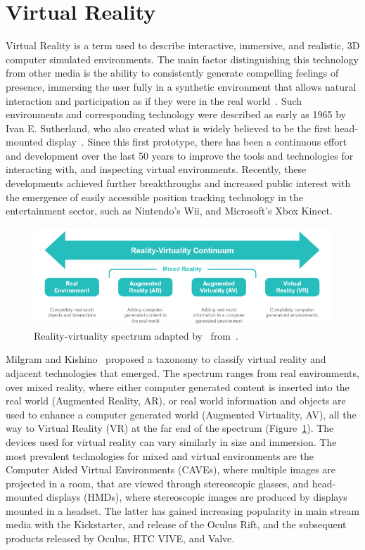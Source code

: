 \section{Virtual Reality}\label{sec:virtual-reality}

Virtual Reality is a term used to describe interactive, immersive, and realistic, 3D computer simulated environments.
The main factor distinguishing this technology from other media is the ability to consistently generate compelling
feelings of presence, immersing the user fully in a synthetic environment that allows natural interaction and
participation as if they were in the real world~\cite{Davis2014}.
Such environments and corresponding technology were described as early as 1965 by Ivan E. Sutherland, who also created
what is widely believed to be the first head-mounted display~\cite{Sutherland1968}.
Since this first prototype, there has been a continuous effort and development over the last 50 years to improve the
tools and technologies for interacting with, and inspecting virtual environments.
Recently, these developments achieved further breakthroughs and increased public interest with the emergence of
easily accessible position tracking technology in the entertainment sector, such as Nintendo's Wii, and Microsoft's
Xbox Kinect.

\begin{figure}[h]
    \centering
    \includegraphics[width=\textwidth]{content/2_1_virtual_reality/img/reality-virtuality-continuum[Spivak2015]}
    \caption{Reality-virtuality spectrum adapted by~\cite{Spivak2015} from~\cite{Milgram1994}.}
    \label{fig:environment-spectrum}
\end{figure}

Milgram and Kishino~\cite{Milgram1994} proposed a taxonomy to classify virtual reality and adjacent technologies that
emerged.
The spectrum ranges from real environments, over mixed reality, where either computer generated content is inserted
into the real world (Augmented Reality, AR), or real world information and objects are used to enhance a computer
generated world (Augmented Virtuality, AV), all the way to Virtual Reality (VR) at the far end of the spectrum
(Figure~\ref{fig:environment-spectrum}).
The devices used for virtual reality can vary similarly in size and immersion.
The most prevalent technologies for mixed and virtual environments are the Computer Aided Virtual Environments (CAVEs),
where multiple images are projected in a room, that are viewed through stereoscopic glasses, and head-mounted
displays (HMDs), where stereoscopic images are produced by displays mounted in a headset.
The latter has gained increasing popularity in main stream media with the Kickstarter, and release of the Oculus Rift,
and the subsequent products released by Oculus, HTC VIVE, and Valve.

